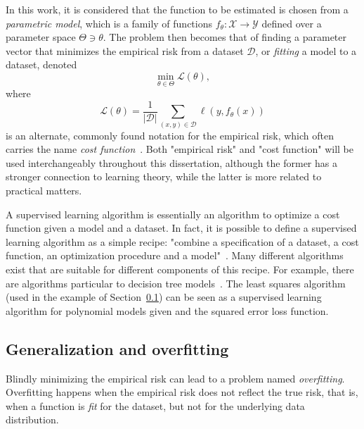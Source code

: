 In this work, it is considered that the function to be estimated is chosen from a \emph{parametric model}\footnotemark, which is a family of functions $f_\theta: \mathcal{X} \longrightarrow \mathcal{Y}$ defined over a parameter space $\Theta \ni \theta$.
The problem then becomes that of finding a parameter vector that minimizes the empirical risk from a dataset $\mathcal{D}$, or \emph{fitting} a model to a dataset, denoted \[
\min_{\theta \in  \Theta} \mathcal{L}(\theta)
,\] where \[
    \mathcal{L}(\theta) = \frac{1}{|\mathcal{D}|} \sum_{(x,y)\in \mathcal{D}} \ell(y, f_\theta(x))
\] is an alternate, commonly found notation for the empirical risk, which often carries the name \emph{cost function}~\cite{murphyMachineLearningProbabilistic2013,Goodfellow-et-al-2016}.
Both "empirical risk" and "cost function" will be used interchangeably throughout this dissertation, although the former has a stronger connection to learning theory, while the latter is more related to practical matters.

A supervised learning algorithm is essentially an algorithm to optimize a cost function given a model and a dataset.
In fact, it is possible to define a supervised learning algorithm as a simple recipe: "combine a speciﬁcation of a dataset, a cost function, an optimization procedure and a model"~\cite{Goodfellow-et-al-2016}.
Many different algorithms exist that are suitable for different components of this recipe.
For example, there are algorithms particular to decision tree models~\cite{breimanClassificationRegressionTrees2017}.
The least squares algorithm (used in the example of Section~\ref{sec:generalization-overfitting}) can be seen as a supervised learning algorithm for polynomial models given and the squared error loss function.

\subsection{Generalization and overfitting}\label{sec:generalization-overfitting}

Blindly minimizing the empirical risk can lead to a problem named \emph{overfitting}.
Overfitting happens when the empirical risk does not reflect the true risk, that is, when a function is \emph{fit} for the dataset, but not for the underlying data distribution.

